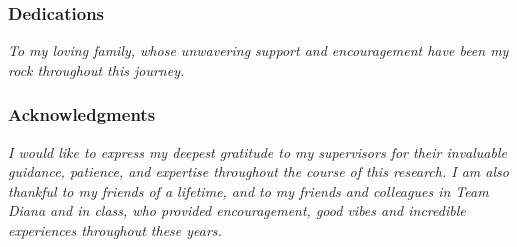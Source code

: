 \newpage

\subsubsection{Dedications}

\textit{To my loving family, whose unwavering support and encouragement have 
    been my rock throughout this journey.}


\subsubsection{Acknowledgments}

    \textit{I would like to express my deepest gratitude to my supervisors 
    for their invaluable guidance, patience, and expertise throughout the course of this 
    research. 
    I am also thankful to my friends of a lifetime, and to my friends and colleagues 
    in Team Diana and in class, who provided encouragement, good vibes and incredible experiences 
    throughout these years.}